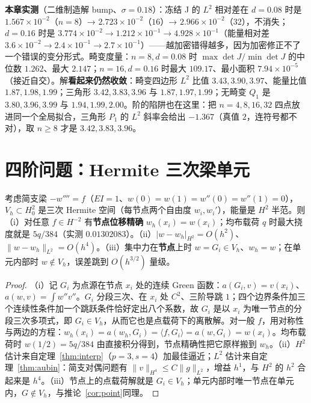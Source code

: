 \textbf{本章实测}（二维制造解 bump、$\sigma=0.18$）：冻结 J 的 $L^2$ 相对差在 $d=0.08$ 时是
$1.567\times10^{-2}$（$n=8$）→ $2.723\times10^{-2}$（$16$）→ $2.966\times10^{-2}$（$32$），不消失；$d=0.16$
时是 $3.774\times10^{-2}\to1.212\times10^{-1}\to4.928\times10^{-1}$（能量相对差
$3.6\times10^{-2}\to2.4\times10^{-1}\to2.7\times10^{-1}$）——越加密错得越多，因为加密修正不了一个错误的变分形式。畸变度量：$n=8,d=0.08$
时 $\max\det J/\min\det J$ 的中位数 $1.262$、最大 $2.147$；$n=16,d=0.16$ 时最大 $109.17$、最小面积
$7.94\times10^{-5}$（接近自交）。解\textbf{看起来仍然收敛}：畸变四边形 $L^2$ 比值 $3.43,3.90,3.97$、能量比值
$1.87,1.98,1.99$；三角形 $3.42,3.83,3.96$ 与 $1.87,1.97,1.99$；无畸变 $Q_1$ 是 $3.80,3.96,3.99$ 与
$1.94,1.99,2.00$。阶的陷阱也在这里：把 $n=4,8,16,32$ 四点放进同一个全局拟合，三角形 $P_1$ 的 $L^2$ 斜率会给出 $-1.367$（真值
$2$，连符号都不对），取 $n\ge8$ 才是 $3.42,3.83,3.96$。

\section{四阶问题：Hermite 三次梁单元}

\begin{theorem}[梁的节点精确性与收敛阶]
\label{thm:hermite}
考虑简支梁 $-w''''=f$（$EI=1$、$w(0)=w(1)=w''(0)=w''(1)=0$），$V_h\subset H^2_0$ 是三次 Hermite 空间（每节点两个自由度
$w_i,w_i'$），能量是 $H^2$ 半范。则（i）对任意 $f\in H^{-2}$ 有\textbf{节点位移精确} $w_h(x_i)=w(x_i)$；均布载荷 $q$
时最大挠度就是 $5q/384$（实测
$0.01302083$）。（ii）$|w-w_h|_{H^2}=O(h^2)$、$\|w-w_h\|_{L^2}=O(h^4)$。（iii）集中力在\textbf{节点}上时
$w=G_i\in V_h$、$w_h=w$；在单元内部时 $w\notin V_h$，误差跳到 $O(h^{3/2})$ 量级。
\end{theorem}
\begin{proof}
（i）记 $G_i$ 为点源在节点 $x_i$ 处的连续 Green 函数：$a(G_i,v)=v(x_i)$、$a(w,v)=\int w''v''$。$G_i$ 分段三次、在 $x_i$
处 $C^2$、三阶导跳 $1$；四个边界条件加三个连续性条件加一个跳跃条件恰好定出八个系数，故 $G_i$ 是以 $x_i$ 为唯一节点的分段三次多项式，即 $G_i\in
V_h$，从而它也是点载荷下的离散解。对一般 $f$，用对称性与两边的方程：$w_h(x_i)=a(w_h,G_i)=\langle
f,G_i\rangle=a(w,G_i)=w(x_i)$。均布载荷时 $w(1/2)=5q/384$ 由直接积分得到，节点精确性把它原样搬到 $w_h$。（ii）$H^2$
估计来自定理~\ref{thm:interp}（$p=3,s=4$）加最佳逼近；$L^2$ 估计来自定理~\ref{thm:aubin}：简支对偶问题有 $\|v\|_{H^4}\le
C\|g\|_{L^2}$，增益 $h^1$，与 $H^2$ 的 $h^2$ 合起来是 $h^4$。（iii）节点上的点载荷解就是 $G_i\in
V_h$；单元内部时唯一节点在单元内，$G\notin V_h$，与推论~\ref{cor:point}同理。
\end{proof}

